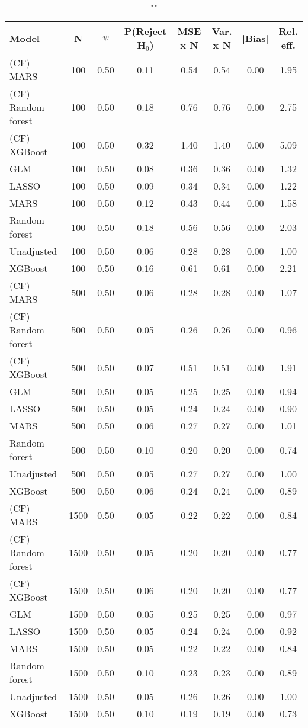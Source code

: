 \begin{table}
\centering
\caption{""}
\begin{tabular}{lccccccc}
\toprule
Model & N & $\psi$ & P(Reject H$_0$) & MSE x N & Var. x N & |Bias| & Rel. eff.\\ \midrule
(CF) MARS & 100 & 0.50 & 0.11 & 0.54 & 0.54 & 0.00 & 1.95 \\ 
(CF) Random forest & 100 & 0.50 & 0.18 & 0.76 & 0.76 & 0.00 & 2.75 \\ 
(CF) XGBoost & 100 & 0.50 & 0.32 & 1.40 & 1.40 & 0.00 & 5.09 \\ 
GLM & 100 & 0.50 & 0.08 & 0.36 & 0.36 & 0.00 & 1.32 \\ 
LASSO & 100 & 0.50 & 0.09 & 0.34 & 0.34 & 0.00 & 1.22 \\ 
MARS & 100 & 0.50 & 0.12 & 0.43 & 0.44 & 0.00 & 1.58 \\ 
Random forest & 100 & 0.50 & 0.18 & 0.56 & 0.56 & 0.00 & 2.03 \\ 
Unadjusted & 100 & 0.50 & 0.06 & 0.28 & 0.28 & 0.00 & 1.00 \\ 
XGBoost & 100 & 0.50 & 0.16 & 0.61 & 0.61 & 0.00 & 2.21 \\ \addlinespace 
(CF) MARS & 500 & 0.50 & 0.06 & 0.28 & 0.28 & 0.00 & 1.07 \\ 
(CF) Random forest & 500 & 0.50 & 0.05 & 0.26 & 0.26 & 0.00 & 0.96 \\ 
(CF) XGBoost & 500 & 0.50 & 0.07 & 0.51 & 0.51 & 0.00 & 1.91 \\ 
GLM & 500 & 0.50 & 0.05 & 0.25 & 0.25 & 0.00 & 0.94 \\ 
LASSO & 500 & 0.50 & 0.05 & 0.24 & 0.24 & 0.00 & 0.90 \\ 
MARS & 500 & 0.50 & 0.06 & 0.27 & 0.27 & 0.00 & 1.01 \\ 
Random forest & 500 & 0.50 & 0.10 & 0.20 & 0.20 & 0.00 & 0.74 \\ 
Unadjusted & 500 & 0.50 & 0.05 & 0.27 & 0.27 & 0.00 & 1.00 \\ 
XGBoost & 500 & 0.50 & 0.06 & 0.24 & 0.24 & 0.00 & 0.89 \\ \addlinespace 
(CF) MARS & 1500 & 0.50 & 0.05 & 0.22 & 0.22 & 0.00 & 0.84 \\ 
(CF) Random forest & 1500 & 0.50 & 0.05 & 0.20 & 0.20 & 0.00 & 0.77 \\ 
(CF) XGBoost & 1500 & 0.50 & 0.06 & 0.20 & 0.20 & 0.00 & 0.77 \\ 
GLM & 1500 & 0.50 & 0.05 & 0.25 & 0.25 & 0.00 & 0.97 \\ 
LASSO & 1500 & 0.50 & 0.05 & 0.24 & 0.24 & 0.00 & 0.92 \\ 
MARS & 1500 & 0.50 & 0.05 & 0.22 & 0.22 & 0.00 & 0.84 \\ 
Random forest & 1500 & 0.50 & 0.10 & 0.23 & 0.23 & 0.00 & 0.89 \\ 
Unadjusted & 1500 & 0.50 & 0.05 & 0.26 & 0.26 & 0.00 & 1.00 \\ 
XGBoost & 1500 & 0.50 & 0.10 & 0.19 & 0.19 & 0.00 & 0.73 \\
\bottomrule
\end{tabular}
\end{table}

